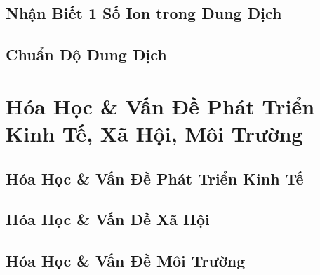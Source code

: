 \documentclass{article}
\numberwithin{equation}{section}
\begin{document}

\subsection{Nhận Biết 1 Số Ion trong Dung Dịch}


\subsection{Chuẩn Độ Dung Dịch}


\section{Hóa Học \& Vấn Đề Phát Triển Kinh Tế, Xã Hội, Môi Trường}

\subsection{Hóa Học \& Vấn Đề Phát Triển Kinh Tế}


\subsection{Hóa Học \& Vấn Đề Xã Hội}


\subsection{Hóa Học \& Vấn Đề Môi Trường}


\newpage
\printbibliography[heading=bibintoc]
	
\end{document}
